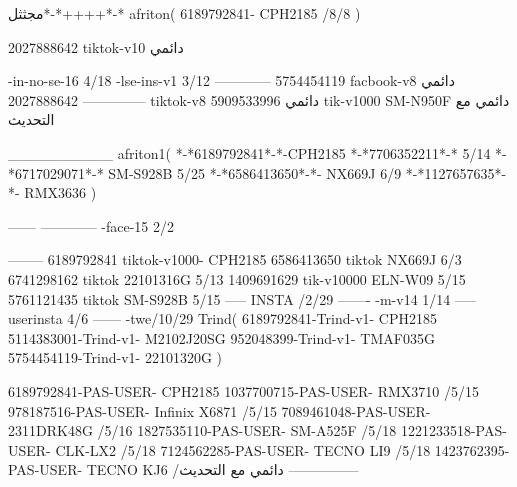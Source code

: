 مجثثل*-*++++*-*
afriton(
6189792841- CPH2185  /8/8
)

2027888642 tiktok-v10
دائمي

-in-no-se-16 4/18
-lse-ins-v1 3/12
------------
5754454119 facbook-v8
دائمي
--------------
2027888642 tiktok-v8
دائمي
5909533996 tik-v1000  SM-N950F
دائمي مع التحديث

__________
afriton1(
*-*6189792841*-*-CPH2185
*-*7706352211*-* 5/14
*-*6717029071*-*  SM-S928B 5/25
*-*6586413650*-*- NX669J  6/9
*-*1127657635*-*- RMX3636 \5
)


------
------------
-face-15 2/2

--------
6189792841 tiktok-v1000- CPH2185 
6586413650 tiktok NX669J  6/3
6741298162 tiktok 22101316G  5/13
1409691629 tik-v10000 ELN-W09  5/15
5761121435 tiktok SM-S928B   5/15
-----
 INSTA /2/29
-------
-m-v14 1/14
-----
userinsta 4/6
------
-twe/10/29
Trind(
6189792841-Trind-v1- CPH2185 
5114383001-Trind-v1- M2102J20SG \5
952048399-Trind-v1- TMAF035G \5
5754454119-Trind-v1- 22101320G \5
)

6189792841-PAS-USER- CPH2185 
1037700715-PAS-USER- RMX3710  /5/15
978187516-PAS-USER- Infinix X6871  /5/15
7089461048-PAS-USER- 2311DRK48G  /5/16
1827535110-PAS-USER- SM-A525F  /5/18
1221233518-PAS-USER-  CLK-LX2  /5/18
7124562285-PAS-USER-  TECNO LI9  /5/18
1423762395-PAS-USER- TECNO KJ6  /دائمي مع التحديث
    ---------------
